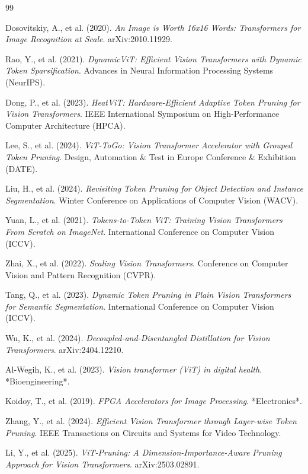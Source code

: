 \begin{thebibliography}{99}

Dosovitskiy, A., et al. (2020). \textit{An Image is Worth 16x16 Words: Transformers for Image Recognition at Scale}. arXiv:2010.11929.

Rao, Y., et al. (2021). \textit{DynamicViT: Efficient Vision Transformers with Dynamic Token Sparsification}. Advances in Neural Information Processing Systems (NeurIPS).

Dong, P., et al. (2023). \textit{HeatViT: Hardware-Efficient Adaptive Token Pruning for Vision Transformers}. IEEE International Symposium on High-Performance Computer Architecture (HPCA).

Lee, S., et al. (2024). \textit{ViT-ToGo: Vision Transformer Accelerator with Grouped Token Pruning}. Design, Automation \& Test in Europe Conference \& Exhibition (DATE).

Liu, H., et al. (2024). \textit{Revisiting Token Pruning for Object Detection and Instance Segmentation}. Winter Conference on Applications of Computer Vision (WACV).

Yuan, L., et al. (2021). \textit{Tokens-to-Token ViT: Training Vision Transformers From Scratch on ImageNet}. International Conference on Computer Vision (ICCV).

Zhai, X., et al. (2022). \textit{Scaling Vision Transformers}. Conference on Computer Vision and Pattern Recognition (CVPR).

Tang, Q., et al. (2023). \textit{Dynamic Token Pruning in Plain Vision Transformers for Semantic Segmentation}. International Conference on Computer Vision (ICCV).

Wu, K., et al. (2024). \textit{Decoupled-and-Disentangled Distillation for Vision Transformers}. arXiv:2404.12210.

Al-Wegih, K., et al. (2023). \textit{Vision transformer (ViT) in digital health}. *Bioengineering*.

Koidoy, T., et al. (2019). \textit{FPGA Accelerators for Image Processing}. *Electronics*.

Zhang, Y., et al. (2024). \textit{Efficient Vision Transformer through Layer-wise Token Pruning}. IEEE Transactions on Circuits and Systems for Video Technology.

Li, Y., et al. (2025). \textit{ViT-Pruning: A Dimension-Importance-Aware Pruning Approach for Vision Transformers}. arXiv:2503.02891.


\end{thebibliography}
